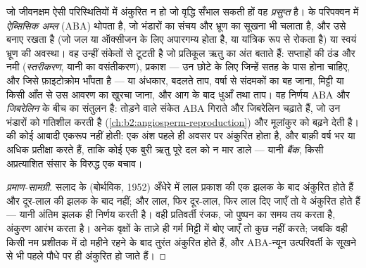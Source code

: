\begin{definition}[बीज प्रसुप्ति]\label{def:b2:plant-flowering:dormancy}
जो जीवनक्षम  ऐसी परिस्थितियों में अंकुरित न हो जो वृद्धि सँभाल
सकती हों वह \emph{प्रसुप्त} है।   के
परिपक्वन में \emph{ऐब्सिसिक अम्ल} (ABA) थोपता है, जो भंडारों का
संचय और भ्रूण का सूखना भी चलाता है, और उसे
 बनाए रखता है (जो जल या ऑक्सीजन के लिए अपारगम्य होता है, या
यांत्रिक रूप से रोकता है) या स्वयं भ्रूण की अवस्था। वह
उन्हीं संकेतों से टूटती है जो प्रतिकूल ऋतु का अंत बताते हैं:
सप्ताहों की ठंड और नमी (\emph{स्तरीकरण}, यानी  का
वसंतीकरण), प्रकाश --- उन छोटे  के लिए जिन्हें सतह के पास होना
चाहिए, और जिसे फ़ाइटोक्रोम भाँपता है --- या अंधकार, बदलते
ताप, वर्षा से संदमकों का बह जाना, मिट्टी या किसी आँत से उस
आवरण का खुरचा जाना, और आग के बाद धुआँ तथा ताप। वह
निर्णय ABA और \emph{जिबरेलिन} के बीच का संतुलन है: तोड़ने वाले संकेत ABA
गिराते और जिबरेलिन चढ़ाते हैं, जो उन भंडारों को गतिशील करती है
(\cref{ch:b2:angiosperm-reproduction}) और मूलांकुर को बढ़ने देती है।
 की कोई आबादी एकरूप नहीं होती: एक अंश
पहले ही अवसर पर अंकुरित होता है, और बाक़ी वर्ष भर या अधिक प्रतीक्षा करते
हैं, ताकि कोई एक बुरी ऋतु पूरे दल को न मार डाले --- यानी
\emph{ बैंक}, किसी अप्रत्याशित संसार के विरुद्ध एक बचाव।
\end{definition}
\begin{proof}[प्रमाण-सामग्री]
सलाद के  (बोर्थविक, 1952) अँधेरे में लाल प्रकाश की एक झलक के
बाद अंकुरित होते हैं और दूर-लाल की झलक के बाद नहीं; और लाल, फिर
दूर-लाल, फिर लाल दिए जाएँ तो वे अंकुरित होते हैं --- यानी अंतिम झलक ही
निर्णय करती है। वही प्रतिवर्ती रंजक, जो पुष्पन का समय तय करता है, अंकुरण
आरंभ करता है। अनेक वृक्षों के  ताज़े ही गर्म मिट्टी में बोए जाएँ तो
कुछ नहीं करते; जबकि वही
 किसी नम प्रशीतक में दो महीने रहने के बाद तुरंत अंकुरित होते हैं,
और ABA-न्यून उत्परिवर्ती  के सूखने से भी पहले पौधे पर ही अंकुरित हो
जाते हैं।
\end{proof}

